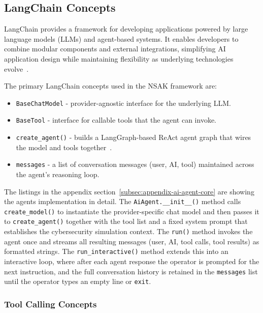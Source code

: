 \subsection{LangChain Concepts}\label{subsec:ai-scenarios-langchain-concepts}

LangChain provides a framework for developing applications powered by large language models (\gls{LLM}s) and agent-based systems.
It enables developers to combine modular components and external integrations, simplifying \gls{AI} application design while maintaining flexibility as underlying technologies evolve~\cite{langchain_repo}.

The primary LangChain concepts used in the \gls{NSAK} framework are:

\begin{itemize}
    \item \texttt{BaseChatModel} - provider-agnostic interface for the underlying \gls{LLM}.
    \item \texttt{BaseTool} - interface for callable tools that the agent can invoke.
    \item \texttt{create_agent()} - builds a LangGraph-based ReAct agent graph that wires the model and tools together~\cite{langgraph_docs}.
    \item \texttt{messages} - a list of conversation messages (user, \gls{AI}, tool) maintained across the agent's reasoning loop.
\end{itemize}

The listings in the appendix section~\ref{subsec:appendix-ai-agent-core} are showing the agents implementation in detail.
The \texttt{AiAgent.__init__()} method calls \texttt{create_model()} to instantiate the provider-specific chat model
and then passes it to \texttt{create_agent()} together with the tool list and a fixed system prompt that establishes the cybersecurity simulation context.
The \texttt{run()} method invokes the agent once and streams all resulting messages (user, \gls{AI}, tool calls, tool results) as formatted strings.
The \texttt{run_interactive()} method extends this into an interactive loop,
where after each agent response the operator is prompted for the next instruction,
and the full conversation history is retained in the \texttt{messages} list until the operator types an empty line or \texttt{exit}.

\subsubsection{Tool Calling Concepts}\label{subsubsec:ai-agent-tool-calling-concepts}

